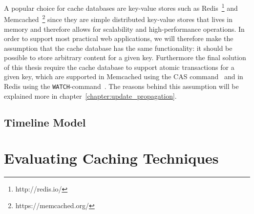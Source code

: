 A popular choice for cache databases are key-value stores such as Redis~\footnote{http://redis.io/} and Memcached~\footnote{https://memcached.org/} since they are simple distributed key-value stores that lives in memory and therefore allows for scalability and high-performance operations. In order to support most practical web applications, we will therefore make the assumption that the cache database has the same functionality: it should be possible to store arbitrary content for a given key. Furthermore the final solution of this thesis require the cache database to support atomic transactions for a given key, which are supported in Memcached using the CAS command~\cite{docs:memcached-protocol} and in Redis using the \verb$WATCH$-command~\cite{docs:redis-transactions}. The reasons behind this assumption will be explained more in chapter~\ref{chapter:update_propagation}.


\subsection{Timeline Model}
\label{subsec:timeline_model}




\section{Evaluating Caching Techniques}
\label{sec:evaluating_caching_techniques}




